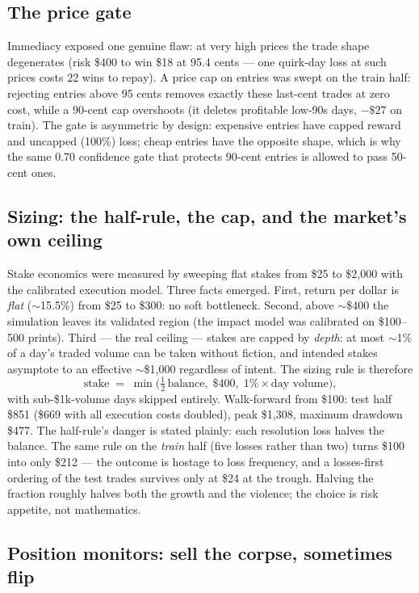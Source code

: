 \documentclass[11pt,a4paper]{article}
\begin{document}
\subsection{The price gate}

Immediacy exposed one genuine flaw: at very high prices the trade shape
degenerates (risk \$400 to win \$18 at 95.4 cents --- one quirk-day loss at
such prices costs 22 wins to repay). A price cap on entries was swept on the
train half: rejecting entries above 95 cents removes exactly these
last-cent trades at zero cost, while a 90-cent cap overshoots (it deletes
profitable low-90s days, $-\$27$ on train). The gate is asymmetric by
design: expensive entries have capped reward and uncapped (100\%) loss;
cheap entries have the opposite shape, which is why the same 0.70
confidence gate that protects 90-cent entries is allowed to pass 50-cent
ones.

\subsection{Sizing: the half-rule, the cap, and the market's own ceiling}

Stake economics were measured by sweeping flat stakes from \$25 to \$2{,}000
with the calibrated execution model. Three facts emerged. First, return per
dollar is \emph{flat} ($\sim$15.5\%) from \$25 to \$300: no soft bottleneck.
Second, above $\sim$\$400 the simulation leaves its validated region (the
impact model was calibrated on \$100--500 prints). Third --- the real
ceiling --- stakes are capped by \emph{depth}: at most $\sim$1\% of a day's
traded volume can be taken without fiction, and intended stakes asymptote to
an effective $\sim$\$1{,}000 regardless of intent. The sizing rule is
therefore
\[
\text{stake} \;=\; \min\bigl(\tfrac{1}{2}\,\text{balance},\; \$400,\;
1\%\times\text{day volume}\bigr),
\]
with sub-\$1k-volume days skipped entirely. Walk-forward from \$100: test
half \$851 (\$669 with all execution costs doubled), peak \$1{,}308,
maximum drawdown \$477. The half-rule's danger is stated plainly: each
resolution loss halves the balance. The same rule on the \emph{train} half
(five losses rather than two) turns \$100 into only \$212 --- the outcome
is hostage to loss frequency, and a losses-first ordering of the test trades
survives only at \$24 at the trough. Halving the fraction roughly halves
both the growth and the violence; the choice is risk appetite, not
mathematics.

\subsection{Position monitors: sell the corpse, sometimes flip}
\end{document}
